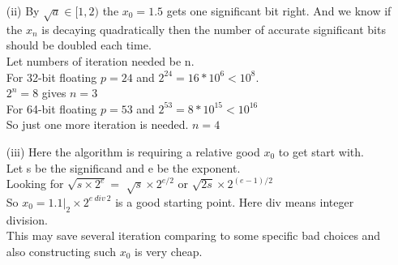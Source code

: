 \documentclass[10pt,twoside,a4paper]{article}
\begin{document}
\begin{itemize}
\begin{itemize}
\item[(ii)]
By $\sqrt{a}\in [1,2)$ the $x_0=1.5$ gets one significant bit right. And we know if the $x_n$ is decaying quadratically then the number of accurate significant bits should be doubled each time.
\\Let numbers of iteration needed be n.
\\For 32-bit floating $p=24$ and $2^{24}=16*10^6<10^8$.
\\$2^n=8$ gives $n=3$
\\For 64-bit floating $p=53$ and $2^{53}=8*10^{15}<10^{16}$
\\So just one more iteration is needed. $n=4$ 
\item[(iii)]
Here the algorithm is requiring a relative good $x_0$ to get start with.
\\Let s be the significand and e be the exponent.
\\Looking for $\sqrt{s\times2^e}=$ $\sqrt{s}\times2^{e/2}$ or $\sqrt{2s}\times2^{(e-1)/2}$
\\So $x_0=1.1|_2 \times 2^{e\  div\  2}$ is a good starting point. Here div means integer division.
\\This may save several iteration comparing to some specific bad choices and also constructing such $x_0$ is very cheap.
\end{itemize}
\end{itemize}
\end{document}
